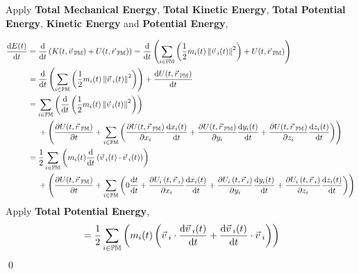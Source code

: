 \documentclass[12pt]{amsart}
\renewenvironment{proof}{{\bfseries Proof.}}{\qed}
\let\oldvec\vec
\renewcommand{\vec}[1]{\oldvec{#1}\hspace{0.1em}}
\begin{document}
\begin{proof}
Apply \textbf{Total Mechanical Energy}, \textbf{Total Kinetic Energy}, \textbf{Total Potential Energy}, \textbf{Kinetic Energy} and \textbf{Potential Energy},

\begin{align*}
\dfrac{\mathrm{d} E(t)}{\mathrm{d} t} 
&= \dfrac{\mathrm{d}}{\mathrm{d} t} \left( K (t, \vec{v}_\mathbb{PM}) + U  (t, \vec{r}_\mathbb{PM}) \right) = \dfrac{\mathrm{d}}{\mathrm{d} t} \left( \displaystyle\sum_{i \in \mathbb{PM}}\left(\dfrac{1}{2}  m_i (t) \left \| \vec{v}_i (t) \right \|^2 \right) + U  (t, \vec{r}_\mathbb{PM}) \right) \\ 
&= \dfrac{\mathrm{d}}{\mathrm{d} t} \left( \displaystyle\sum_{i \in \mathbb{PM}} \left( \dfrac{1}{2} m_i (t) \left \| \vec{v}_i (t) \right \|^2 \right) \right) + \dfrac{\mathrm{d} U  (t, \vec{r}_\mathbb{PM})}{\mathrm{d} t} \\ 
&= \displaystyle\sum_{i \in \mathbb{PM}}\left( \dfrac{\mathrm{d}}{\mathrm{d} t} \left( \dfrac{1}{2} m_i (t) \left \| \vec{v}_i (t) \right \|^2 \right) \right) \\
& \quad \ + \left ( \dfrac{\partial U  (t, \vec{r}_\mathbb{PM})}{\partial t} + \displaystyle \sum_{i \in \mathbb{PM}} \left ( \dfrac{\partial U  (t, \vec{r}_\mathbb{PM})}{\partial x_i}\dfrac{\mathrm{d} x_i(t)}{\mathrm{d} t} + \dfrac{\partial U  (t, \vec{r}_\mathbb{PM})}{\partial y_i}\dfrac{\mathrm{d} y_i(t)}{\mathrm{d} t} + \dfrac{\partial U  (t, \vec{r}_\mathbb{PM})}{\partial z_i}\dfrac{\mathrm{d} z_i(t)}{\mathrm{d} t} \right ) \right ) \\ 
&= \dfrac{1}{2} \displaystyle\sum_{i \in \mathbb{PM}}\left( m_i (t) \dfrac{\mathrm{d}}{\mathrm{d} t} \left( \vec{v}_i (t) \cdot \vec{v}_i (t) \right) \right)\\
& \quad \ + \left ( \dfrac{\partial U  (t, \vec{r}_\mathbb{PM})}{\partial t} + \displaystyle \sum_{i \in \mathbb{PM}} \left ( 0 \dfrac{\mathrm{d} t}{\mathrm{d} t} +\dfrac{\partial  U_i \left ( t, \vec{r}_i \right )}{\partial x_i}\dfrac{\mathrm{d} x_i(t)}{\mathrm{d} t} + \dfrac{\partial  U_i \left ( t, \vec{r}_i \right )}{\partial y_i}\dfrac{\mathrm{d} y_i(t)}{\mathrm{d} t} + \dfrac{\partial  U_i \left ( t, \vec{r}_i \right )}{\partial z_i}\dfrac{\mathrm{d} z_i(t)}{\mathrm{d} t} \right ) \right )
\end{align*}
Apply \textbf{Total Potential Energy},
\begin{align*}
&= \dfrac{1}{2}\displaystyle\sum_{i \in \mathbb{PM}}\left( m_i (t) \left ( \vec{v}_i \cdot \dfrac{\mathrm{d} \vec{v}_i (t)}{\mathrm{d} t} + \dfrac{\mathrm{d} \vec{v}_i (t)}{\mathrm{d} t} \cdot \vec{v}_i\right) \right )\\

\end{align*}
\end{proof}
\end{document}
